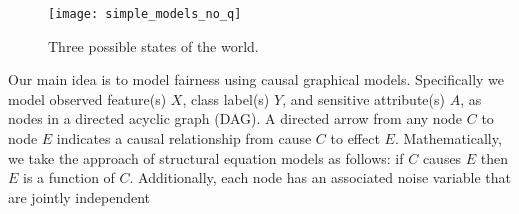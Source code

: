 \begin{figure*}[th!]
\begin{center}
\vspace{-2ex}
\centerline{\texttt{[image: simple\_models\_no\_q]}}
\vspace{-2ex}
\caption{Three possible states of the world.\label{figure.simple_models}}
\vspace{-2ex}
\end{center}
\end{figure*}

Our main idea is to model fairness using causal graphical
models\cite{pearl:09}. Specifically we model observed feature(s) $X$,
class label(s) $Y$, and sensitive attribute(s) $A$, as nodes in a
directed acyclic graph (DAG). A directed arrow from any node $C$ to
node $E$ indicates a causal relationship from cause $C$ to effect
$E$. Mathematically, we take the approach of structural equation
models as follows: if $C$ causes $E$ then $E$ is a function of
$C$. Additionally, each node has an associated noise variable that are
jointly independent

















